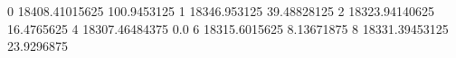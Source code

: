 0 18408.41015625 100.9453125
1 18346.953125 39.48828125
2 18323.94140625 16.4765625
4 18307.46484375 0.0
6 18315.6015625 8.13671875
8 18331.39453125 23.9296875
